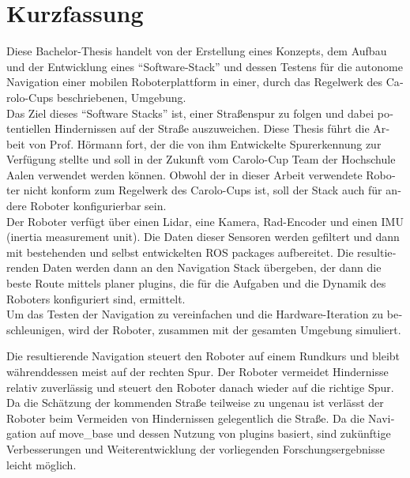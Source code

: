 \chapter*{Kurzfassung}
\label{kurzfassung}

\begin{otherlanguage}{ngerman}

Diese Bachelor-Thesis handelt von der Erstellung eines Konzepts, dem Aufbau und der Entwicklung eines ``Software-Stack'' und dessen Testens für die autonome Navigation einer mobilen Roboterplattform in einer, durch das Regelwerk des Carolo-Cups beschriebenen, Umgebung.\\

Das Ziel dieses ``Software Stacks'' ist, einer Straßenspur zu folgen und dabei potentiellen Hindernissen auf der Straße auszuweichen. Diese Thesis führt die Arbeit von Prof. Hörmann fort, der die von ihm Entwickelte Spurerkennung zur Verfügung stellte und soll in der Zukunft vom Carolo-Cup Team der Hochschule Aalen verwendet werden können. Obwohl der in dieser Arbeit verwendete Roboter nicht konform zum Regelwerk des Carolo-Cups ist, soll der Stack auch für andere Roboter konfigurierbar sein.\\

Der Roboter verfügt über einen Lidar, eine Kamera, Rad-Encoder und einen IMU (inertia measurement unit). Die Daten dieser Sensoren werden gefiltert und dann mit bestehenden und selbst entwickelten ROS packages aufbereitet. Die resultierenden Daten werden dann an den Navigation Stack  übergeben, der dann die beste Route mittels planer plugins, die für die Aufgaben und die Dynamik des Roboters konfiguriert sind, ermittelt.\\

Um das Testen der Navigation zu vereinfachen und die Hardware-Iteration zu beschleunigen, wird der Roboter, zusammen mit der gesamten Umgebung simuliert.

Die resultierende Navigation steuert den Roboter auf einem Rundkurs und bleibt währenddessen meist auf der rechten Spur. Der Roboter vermeidet Hindernisse relativ zuverlässig und steuert den Roboter danach wieder auf die richtige Spur. Da die Schätzung der kommenden Straße teilweise zu ungenau ist verlässt der Roboter beim Vermeiden von Hindernissen gelegentlich die Straße.
Da die Navigation auf move\_base und dessen Nutzung von plugins basiert, sind zukünftige Verbesserungen und Weiterentwicklung der vorliegenden Forschungsergebnisse leicht möglich.

\end{otherlanguage}
